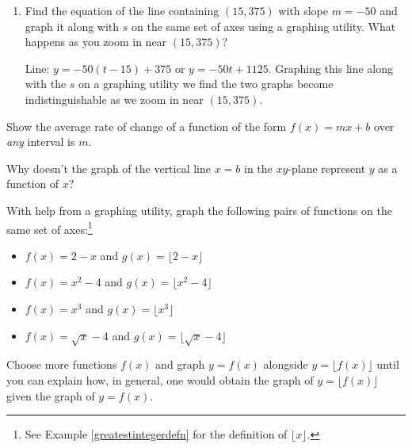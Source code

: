 \documentclass{ximera}
\begin{document}
\begin{problem}
\begin{enumerate}
\begin{solution}
The average rate of change seems to be approaching $-50$.
\end{solution}

\item  Find the equation of the line containing $(15, 375)$ with slope $m = -50$ and graph it along with $s$ on the same set of axes using a graphing utility.  What happens as you zoom in near $(15, 375)$?

\begin{solution}
Line:  $y = -50(t-15) + 375$ or $y =   -50t + 1125$.  Graphing this line along with the $s$ on a graphing utility we find the two graphs become indistinguishable as we zoom in near $(15, 375)$.
\end{solution}

\end{enumerate}
\end{problem}

\begin{problem}\label{lineshaveconstantratesofchange}
Show the average rate of change of a function of the form $f(x) = mx+b$ over \textit{any} interval is $m$.
\end{problem}

\begin{problem}\label{whynoverticallineshere}
Why doesn't the graph of the vertical line $x = b$ in the $xy$-plane represent $y$ as a function of $x$?
\end{problem}

\begin{problem}
With help from a graphing utility, graph the following pairs of functions on the same set of axes:\footnote{See Example \ref{greatestintegerdefn} for the definition of $\lfloor x \rfloor$.}

\begin{itemize}


\item  $f(x) = 2-x$ and $g(x) = \lfloor 2-x \rfloor$

\item  $f(x) = x^2-4$ and $g(x) = \lfloor x^2 -4\rfloor$

\item  $f(x) = x^3$ and $g(x) = \lfloor x^3 \rfloor$

\item  $f(x) = \sqrt{x}-4$ and $g(x) = \lfloor \sqrt{x} -4  \rfloor$

\end{itemize}


Choose more functions $f(x)$ and graph $y = f(x)$ alongside $y = \lfloor f(x) \rfloor$ until you can explain how, in general, one would obtain the graph of $y = \lfloor f(x) \rfloor$ given the graph of $y = f(x)$.
\end{problem}
\end{document}
